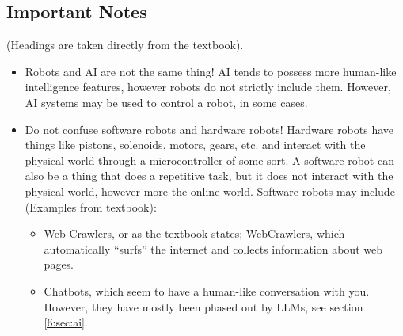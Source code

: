 \documentclass[../main.tex]{subfiles}
\begin{document}
\subsection{Important Notes}

(Headings are taken directly from the textbook).

\begin{itemize}
    \item Robots and AI  are not the same thing!  AI tends to possess more human-like intelligence features, however robots do not strictly include them. However, AI systems may be used to control a robot, in some cases.
    \item Do not confuse software robots and hardware robots! Hardware robots have things like pistons, solenoids, motors, gears, etc. and interact with the physical world through a microcontroller of some sort. A software robot can also be a thing that does a repetitive task, but it does not interact with the physical world, however more the online world. Software robots may include (Examples from textbook):
        \begin{itemize}
            \item Web Crawlers, or as the textbook states; WebCrawlers, which automatically “surfs” the internet and collects information about web pages.
            \item Chatbots, which seem to have a human-like conversation with you. However, they have mostly been phased out by LLMs, see section \ref{6:sec:ai}.
        \end{itemize}
\end{itemize}
\end{document}
